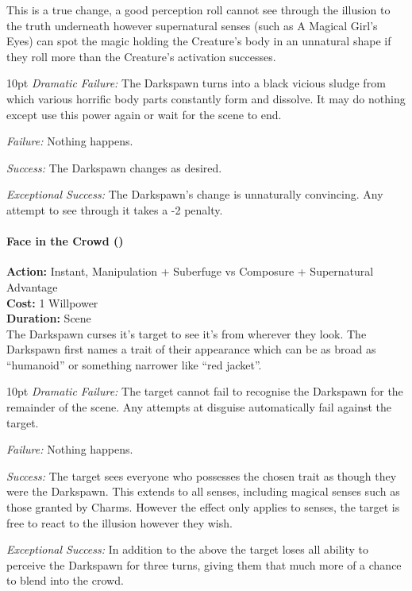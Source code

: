 This is a true change, a good perception roll cannot see through the illusion to the truth underneath however supernatural senses (such as A Magical Girl's Eyes) can spot the magic holding the Creature's body in an unnatural shape if they roll more than the Creature's activation successes.

\begin{myindentpar}{10pt} \emph{Dramatic Failure:} The Darkspawn turns into a black vicious sludge from which various horrific body parts constantly form and dissolve. It may do nothing except use this power again or wait for the scene to end. 

\emph{Failure:} Nothing happens.

\emph{Success:} The Darkspawn changes as desired. 

\emph{Exceptional Success:} The Darkspawn's change is unnaturally convincing. Any attempt to see through it takes a -2 penalty. \end{myindentpar}

\paragraph*{Face in the Crowd (\textbullet\textbullet\textbullet\textbullet)}

\noindent \textbf{Action:} Instant, Manipulation + Suberfuge vs Composure + Supernatural Advantage\\

\noindent \textbf{Cost:} 1 Willpower\\

\noindent \textbf{Duration:} Scene \\

The Darkspawn curses it’s target to see it’s from wherever they look. The Darkspawn first names a trait of their appearance which can be as broad as “humanoid” or something narrower like “red jacket”.

\begin{myindentpar}{10pt} \emph{Dramatic Failure:} The target cannot fail to recognise the Darkspawn for the remainder of the scene. Any attempts at disguise automatically fail against the target. 

\emph{Failure:} Nothing happens.

\emph{Success:} The target sees everyone who possesses the chosen trait as though they were the Darkspawn. This extends to all senses, including magical senses such as those granted by Charms. However the effect only applies to senses, the target is free to react to the illusion however they wish. 

\emph{Exceptional Success:} In addition to the above the target loses all ability to perceive the Darkspawn for three turns, giving them that much more of a chance to blend into the crowd. \end{myindentpar}


